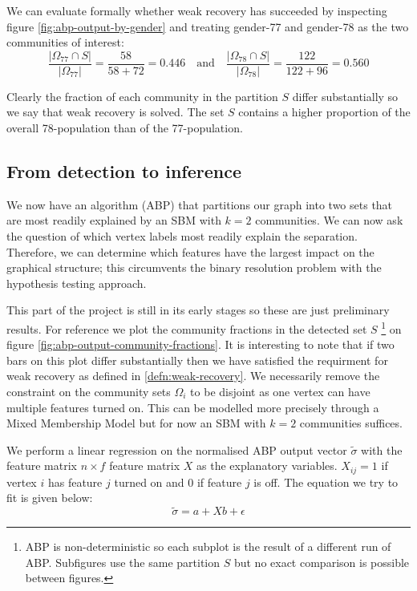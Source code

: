 \documentclass[]{article}
\begin{document}
We can evaluate formally whether weak recovery has succeeded by inspecting figure \ref{fig:abp-output-by-gender} and treating gender-77 and gender-78 as the two communities of interest:
%
\begin{equation}
	\frac{|\Omega_{77} \cap S|}{|\Omega_{77}|} = \frac{58}{58+72} = 0.446
	\quad \textrm{and} \quad
	 \frac{|\Omega_{78} \cap S|}{|\Omega_{78}|} = \frac{122}{122+96} = 0.560
\end{equation}

Clearly the fraction of each community in the partition $S$ differ substantially so we say that weak recovery is solved. The set $S$ contains a higher proportion of the overall 78-population than of the 77-population.

\subsection{From detection to inference}
\label{sect:detection-to-inference}

We now have an algorithm (ABP) that partitions our graph into two sets that are most readily explained by an SBM with $k=2$ communities. We can now ask the question of which vertex labels most readily explain the separation. Therefore, we can determine which features have the largest impact on the graphical structure; this circumvents the binary resolution problem with the hypothesis testing approach.

This part of the project is still in its early stages so these are just preliminary results. For reference we plot the community fractions in the detected set $S$
\footnote{ABP is non-deterministic so each subplot is the result of a different run of ABP. Subfigures use the same partition $S$ but no exact comparison is possible between figures.}
on figure \ref{fig:abp-output-community-fractions}. It is interesting to note that if two bars on this plot differ substantially then we have satisfied the requirment for weak recovery as defined in \ref{defn:weak-recovery}. We necessarily remove the constraint on the community sets $\Omega_i$ to be disjoint as one vertex can have multiple features turned on. This can be modelled more precisely through a Mixed Membership Model but for now an SBM with $k=2$ communities suffices.

We perform a linear regression on the normalised ABP output vector $\tilde{\sigma}$ with the feature matrix $n \times f$ feature matrix $X$ as the explanatory variables. $X_{ij} = 1$ if vertex $i$ has feature $j$ turned on and $0$ if feature $j$ is off. The equation we try to fit is given below:
%
\begin{equation}
	\tilde{\sigma} = a + X b + \epsilon
	\label{eqn:lin-regression}
\end{equation}
\end{document}
